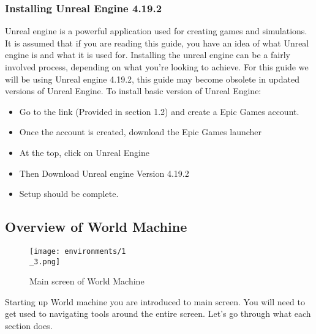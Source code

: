 \documentclass[../main.tex]{subfiles}
\begin{document}
\subsubsection{Installing Unreal Engine 4.19.2}
Unreal engine is a powerful application used for creating games and simulations. It is assumed that if you are reading this guide, you have an idea of what Unreal engine is and what it is used for. Installing the unreal engine can be a fairly involved process, depending on what you're looking to achieve.
For this guide we will be using Unreal engine 4.19.2, this guide may become obsolete in updated versions of Unreal Engine.
To install basic version of Unreal Engine:
\begin{itemize}
    \item Go to the link (Provided in section 1.2) and create a Epic Games account.
    \item Once the account is created, download the Epic Games launcher
    \item At the top, click on Unreal Engine
    \item Then Download Unreal engine Version 4.19.2
    \item Setup should be complete.
\end{itemize}

\subsection{Overview of World Machine}
\begin{figure}[H]
\texttt{[image: environments/1\\\_3.png]}
\caption{Main screen of World Machine}
\end{figure}
Starting up World machine you are introduced to main screen. You will need to get used to navigating tools around the entire screen. Let’s go through what each section does.
\end{document}
